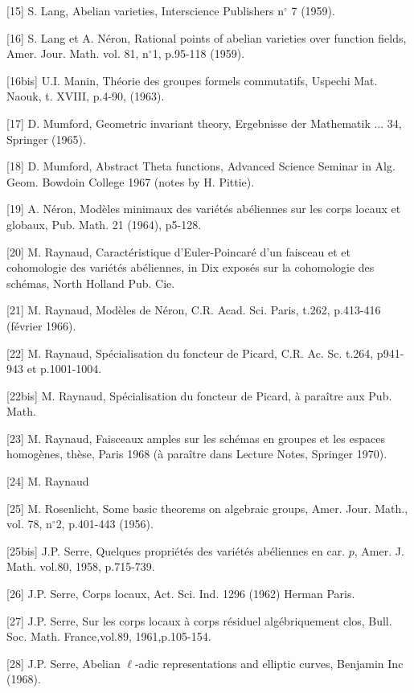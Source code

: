 {[}15] S. Lang, Abelian varieties, Interscience Publishers n$^\circ$ 7 (1959).

{[}16] S. Lang et A. Néron, Rational points of abelian varieties over function fields, Amer. Jour. Math. vol. 81, n$^\circ$1, p.95-118 (1959).

{[}16bis] U.I. Manin, Théorie des groupes formels commutatifs, Uspechi Mat. Naouk, t. XVIII, p.4-90, (1963).

{[}17] D. Mumford, Geometric invariant theory, Ergebnisse der Mathematik ... 34, Springer (1965).

{[}18] D. Mumford, Abstract Theta functions, Advanced Science Seminar in Alg. Geom. Bowdoin College 1967 (notes by H. Pittie).

{[}19] A. Néron, Modèles minimaux des variétés abéliennes sur les corps locaux et globaux, Pub. Math. 21 (1964), p5-128.

{[}20] M. Raynaud, Caractéristique  d'Euler-Poincaré d'un faisceau et et cohomologie des variétés abéliennes, in Dix exposés sur la cohomologie des schémas, North Holland Pub. Cie.

{[}21] M. Raynaud, Modèles de Néron, C.R. Acad. Sci. Paris, t.262, p.413-416 (février 1966).

{[}22] M. Raynaud, Spécialisation du foncteur de Picard, C.R. Ac. Sc. t.264, p941-943 et p.1001-1004.

{[}22bis] M. Raynaud, Spécialisation du foncteur de Picard, à paraître aux Pub. Math.



{[23]} M. Raynaud, Faisceaux amples sur les schémas en groupes et les espaces homogènes, thèse, Paris 1968 (à paraître dans Lecture Notes, Springer 1970).

{[24]} M. Raynaud

{[25]} M. Rosenlicht, Some basic theorems on algebraic groups, Amer. Jour. Math., vol. 78, n$^{\circ}$2, p.401-443 (1956).

{[25bis]} J.P. Serre, Quelques propriétés des variétés abéliennes en car. $p$, Amer. J. Math. vol.80, 1958, p.715-739.

{[26]} J.P. Serre, Corps locaux, Act. Sci. Ind. 1296 (1962) Herman Paris.

{[27]} J.P. Serre, Sur les corps locaux à corps résiduel algébriquement clos, Bull. Soc. Math. France,vol.89, 1961,p.105-154.

{[28]} J.P. Serre, Abelian $\ell$-adic representations and elliptic curves, Benjamin Inc (1968).

